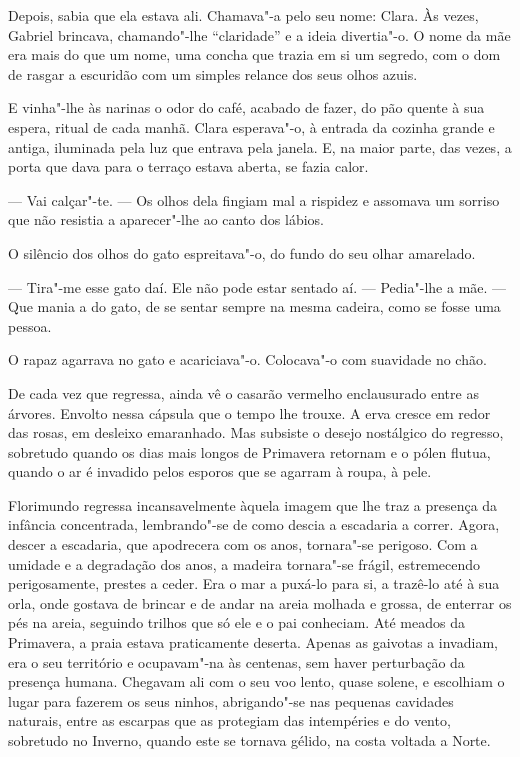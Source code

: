 Depois, sabia que ela estava ali. Chamava"-a pelo seu nome: Clara. Às
vezes, Gabriel brincava, chamando"-lhe ``claridade'' e a ideia
divertia"-o. O nome da mãe era mais do que um nome, uma concha que trazia
em si um segredo, com o dom de rasgar a escuridão com um simples relance
dos seus olhos azuis.

E vinha"-lhe às narinas o odor do café, acabado de fazer, do pão quente à
sua espera, ritual de cada manhã. Clara esperava"-o, à entrada da cozinha
grande e antiga, iluminada pela luz que entrava pela janela. E, na maior
parte, das vezes, a porta que dava para o terraço estava aberta, se
fazia calor.

--- Vai calçar"-te. --- Os olhos dela fingiam mal a rispidez e assomava um
sorriso que não resistia a aparecer"-lhe ao canto dos lábios.

O silêncio dos olhos do gato espreitava"-o, do fundo do seu olhar
amarelado.

--- Tira"-me esse gato daí. Ele não pode estar sentado aí. --- Pedia"-lhe a
mãe. --- Que mania a do gato, de se sentar sempre na mesma cadeira, como
se fosse uma pessoa.

O rapaz agarrava no gato e acariciava"-o. Colocava"-o com suavidade no
chão.

De cada vez que regressa, ainda vê o casarão vermelho enclausurado entre
as árvores. Envolto nessa cápsula que o tempo lhe trouxe. A erva cresce
em redor das rosas, em desleixo emaranhado. Mas subsiste o desejo
nostálgico do regresso, sobretudo quando os dias mais longos de
Primavera retornam e o pólen flutua, quando o ar é invadido pelos
esporos que se agarram à roupa, à pele.

Florimundo regressa incansavelmente àquela imagem que lhe traz a
presença da infância concentrada, lembrando"-se de como descia a
escadaria a correr. Agora, descer a escadaria, que apodrecera com os
anos, tornara"-se perigoso. Com a umidade e a degradação dos anos, a
madeira tornara"-se frágil, estremecendo perigosamente, prestes a ceder.
Era o mar a puxá-lo para si, a trazê-lo até à sua orla, onde gostava de
brincar e de andar na areia molhada e grossa, de enterrar os pés na
areia, seguindo trilhos que só ele e o pai conheciam. Até meados da
Primavera, a praia estava praticamente deserta. Apenas as gaivotas a
invadiam, era o seu território e ocupavam"-na às centenas, sem haver
perturbação da presença humana. Chegavam ali com o seu voo lento, quase
solene, e escolhiam o lugar para fazerem os seus ninhos, abrigando"-se
nas pequenas cavidades naturais, entre as escarpas que as protegiam das
intempéries e do vento, sobretudo no Inverno, quando este se tornava
gélido, na costa voltada a Norte.

